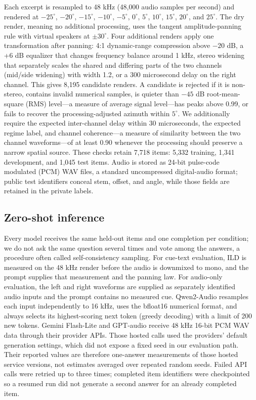\documentclass{article}
\begin{document}
Each excerpt is resampled to 48 kHz (48,000 audio samples per second) and rendered at \(-25^\circ\),
\(-20^\circ\), \(-15^\circ\), \(-10^\circ\), \(-5^\circ\),
\(0^\circ\), \(5^\circ\), \(10^\circ\), \(15^\circ\),
\(20^\circ\), and \(25^\circ\). The dry render, meaning no additional processing, uses the tangent amplitude-panning rule with virtual speakers at \(\pm 30^\circ\). Four additional renders apply one transformation after panning: 4:1 dynamic-range compression above \(-20\) dB, a +6 dB equalizer that changes frequency balance around 1 kHz, stereo widening that separately scales the shared and differing parts of the two channels (mid/side widening) with width 1.2, or a 300 microsecond delay on the right channel. This gives 8,195 candidate renders. A candidate is rejected if it is non-stereo, contains invalid numerical samples, is quieter than \(-45\) dB root-mean-square (RMS) level---a measure of average signal level---has peaks above 0.99, or fails to recover the processing-adjusted azimuth within \(5^\circ\). We additionally require the expected inter-channel delay within 30 microseconds, the expected regime label, and channel coherence---a measure of similarity between the two channel waveforms---of at least 0.90 whenever the processing should preserve a narrow spatial source. These checks retain 7,718 items: 5,332 training, 1,341 development, and 1,045 test items. Audio is stored as 24-bit pulse-code modulated (PCM) WAV files, a standard uncompressed digital-audio format; public test identifiers conceal stem, offset, and angle, while those fields are retained in the private labels.

\subsection{Zero-shot inference}
\label{sec:appendix-zero-shot}

Every model receives the same held-out items and one completion per condition; we do not ask the same question several times and vote among the answers, a procedure often called self-consistency sampling. For cue-text evaluation, ILD is measured on the 48 kHz render before the audio is downmixed to mono, and the prompt supplies that measurement and the panning law. For audio-only evaluation, the left and right waveforms are supplied as separately identified audio inputs and the prompt contains no measured cue. Qwen2-Audio resamples each input independently to 16 kHz, uses the bfloat16 numerical format, and always selects its highest-scoring next token (greedy decoding) with a limit of 200 new tokens. Gemini Flash-Lite and GPT-audio receive 48 kHz 16-bit PCM WAV data through their provider APIs. Those hosted calls used the providers' default generation settings, which did not expose a fixed seed in our evaluation path. Their reported values are therefore one-answer measurements of those hosted service versions, not estimates averaged over repeated random seeds. Failed API calls were retried up to three times; completed item identifiers were checkpointed so a resumed run did not generate a second answer for an already completed item.
\end{document}

